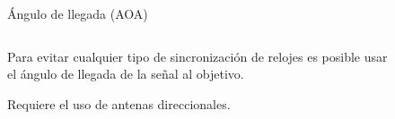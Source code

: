 \documentclass[xcolor=table]{beamer}
\begin{document}
    \begin{frame}{Ángulo de llegada (AOA)}
      \begin{columns}
        \begin{column}{0.5\textwidth}
          Para evitar cualquier tipo de sincronización de relojes es posible usar el ángulo de llegada de la señal al objetivo.

          \vspace{0.5cm}
          Requiere el uso de antenas direccionales.
        \end{column}
        \begin{column}{0.5\textwidth}  
          \begin{figure}[H]
            \centering
            \def\svgwidth{\linewidth}
            
            \label{fig:AOA}
        \end{figure}
        \end{column}
        \end{columns}
      \end{frame}

\end{document}
